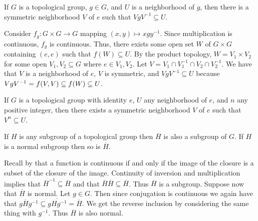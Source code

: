 \documentclass[letterpaper, 11pt, oneside]{book}
\begin{document}
\begin{prop}\label{prop: symmetric_VgV-1}
  If $G$ is a topological group, $g \in G$, and $U$ is a neighborhood of $g$, then there is a symmetric neighborhood $V$ of $e$ such that $VgV^{-1} \subseteq U$.
\end{prop}
\begin{pf}
  Consider $f_{g}\colon G \times G \to G$ mapping $(x, y) \mapsto xgy^{-1}$.
  Since multiplication is continuous, $f_{g}$ is continuous.
  Thus, there exists some open set $W$ of $G \times G$ containing $(e, e)$ such that $f(W) \subseteq U$.
  By the product topology, $W = V_1 \times V_{2}$ for some open $V_{1}, V_{2} \subseteq G$ where $e \in V_{1}, V_{2}$.
  Let $V = V_{1} \cap V_{1}^{-1} \cap V_{2} \cap V_{2}^{-1}$.
  We have that $V$ is a neighborhood of $e$, $V$ is symmetric, and $VgV^{-1} \subseteq U$ because $VgV^{-1} = f\pqty{V, V} \subseteq f(W) \subseteq U$.
\end{pf}

\begin{prop}
  If $G$ is a topological group with identity $e$, $U$ any neighborhood of $e$, and $n$ any positive integer, then there exists a symmetric neighborhood $V$ of $e$ such that $V^{n} \subseteq U$.
\end{prop}
\begin{pf}
\end{pf}

\begin{prop}
  If $H$ is any subgroup of a topological group then $\overline{H}$ is also a subgroup of $G$.
  If $H$ is a normal subgroup then so is $\overline{H}$.
\end{prop}
\begin{pf}
  Recall by  that a function is continuous if and only if the image of the closure is a subset of the closure of the image.
  Continuity of inversion and multiplication implies that $\overline{H}^{-1} \subseteq \overline{H}$ and that $\overline{H} \overline{H} \subseteq \overline{H}$.
  Thus $\overline{H}$ is a subgroup.
  Suppose now that $\overline{H}$ is normal.
  Let $g \in G$.
  Then since conjugation is continuous we again have that $g\overline{H}g^{-1} \subseteq \overline{gHg^{-1}} = \overline{H}$.
  We get the reverse inclusion by considering the same thing with $g^{-1}$.
  Thus $\overline{H}$ is also normal.
\end{pf}
\end{document}
